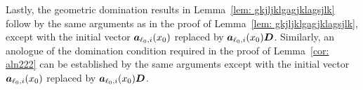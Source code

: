  Lastly, the geometric domination results in Lemma~\ref{lem: gkjljklgagjklagsjlk} follow by the same arguments as in the proof of Lemma~\ref{lem: gkjljklgagjklagsjlk}, except with the initial vector \(\boldsymbol a_{\ell_0,i}(x_0)\) replaced by \(\boldsymbol a_{\ell_0,i}(x_0)\boldsymbol D\). Similarly, an anologue of the domination condition required in the proof of Lemma~\ref{cor: aln222} can be established by the same arguments except with the initial vector \(\boldsymbol a_{\ell_0,i}(x_0)\) replaced by \(\boldsymbol a_{\ell_0,i}(x_0)\boldsymbol D\).
%
